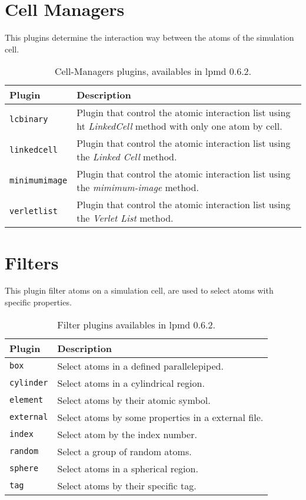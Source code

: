 \section{Cell Managers}
This plugins determine the interaction way between the atoms of the simulation
cell.

\begin{table}[h!]\centering
 \begin{tabular}{|l|p{13cm}|}\hline
 Plugin & Description \\
 \hline\hline
 \texttt{lcbinary} & Plugin that control the atomic interaction list using ht
 \textit{LinkedCell} method with only one atom by cell.\\
 \hline
 \texttt{linkedcell} & Plugin that control the atomic interaction list using the
 \textit{Linked Cell} method.\\
 \hline
 \texttt{minimumimage} & Plugin that control the atomic interaction list using
the \textit{mimimum-image} method.\\
 \hline
 \texttt{verletlist} & Plugin that control the atomic interaction list using
the \textit{Verlet List} method.\\
 \hline
 \end{tabular}
\label{tab:modmanager}
\caption{Cell-Managers plugins, availables in lpmd 0.6.2.}
\end{table}

\section{Filters}
This plugin filter atoms on a simulation cell, are used to select atoms with
specific properties.

\begin{table}[h!]\centering
 \begin{tabular}{|l|p{13cm}|}\hline
 Plugin & Description \\
 \hline\hline
 \texttt{box} & Select atoms in a defined parallelepiped.\\
 \hline
 \texttt{cylinder} & Select atoms in a cylindrical region.\\
 \hline
 \texttt{element} & Select atoms by their atomic symbol.\\
 \hline
 \texttt{external} & Select atoms by some properties in a external file.\\
 \hline
 \texttt{index} & Select atom by the index number.\\
 \hline
 \texttt{random} & Select a group of random atoms.\\
 \hline
 \texttt{sphere} & Select atoms in a spherical region.\\
 \hline
 \texttt{tag} & Select atoms by their specific tag.\\
 \hline
 \end{tabular}
\label{tab:filtros}
\caption{Filter plugins availables in lpmd 0.6.2.}
\end{table}


